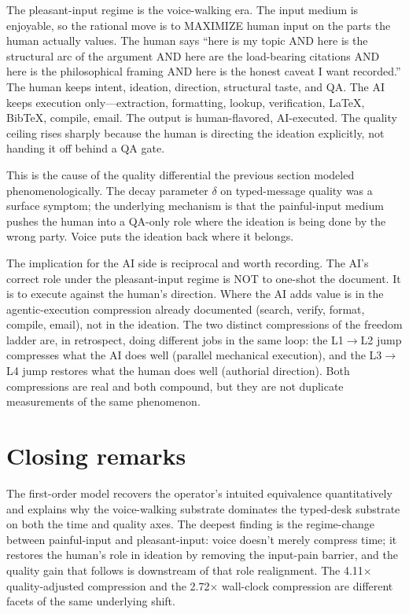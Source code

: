 \documentclass[11pt]{article}
\begin{document}
The pleasant-input regime is the voice-walking era. The input medium is enjoyable, so the rational move is to MAXIMIZE human input on the parts the human actually values. The human says ``here is my topic AND here is the structural arc of the argument AND here are the load-bearing citations AND here is the philosophical framing AND here is the honest caveat I want recorded.'' The human keeps intent, ideation, direction, structural taste, and QA. The AI keeps execution only---extraction, formatting, lookup, verification, LaTeX, BibTeX, compile, email. The output is human-flavored, AI-executed. The quality ceiling rises sharply because the human is directing the ideation explicitly, not handing it off behind a QA gate.

This is the cause of the quality differential the previous section modeled phenomenologically. The decay parameter $\delta$ on typed-message quality was a surface symptom; the underlying mechanism is that the painful-input medium pushes the human into a QA-only role where the ideation is being done by the wrong party. Voice puts the ideation back where it belongs.

The implication for the AI side is reciprocal and worth recording. The AI's correct role under the pleasant-input regime is NOT to one-shot the document. It is to execute against the human's direction. Where the AI adds value is in the agentic-execution compression already documented (search, verify, format, compile, email), not in the ideation. The two distinct compressions of the freedom ladder are, in retrospect, doing different jobs in the same loop: the L1$\rightarrow$L2 jump compresses what the AI does well (parallel mechanical execution), and the L3$\rightarrow$L4 jump restores what the human does well (authorial direction). Both compressions are real and both compound, but they are not duplicate measurements of the same phenomenon.

\section{Closing remarks}

The first-order model recovers the operator's intuited equivalence quantitatively and explains why the voice-walking substrate dominates the typed-desk substrate on both the time and quality axes. The deepest finding is the regime-change between painful-input and pleasant-input: voice doesn't merely compress time; it restores the human's role in ideation by removing the input-pain barrier, and the quality gain that follows is downstream of that role realignment. The 4.11$\times$ quality-adjusted compression and the 2.72$\times$ wall-clock compression are different facets of the same underlying shift.
\end{document}
